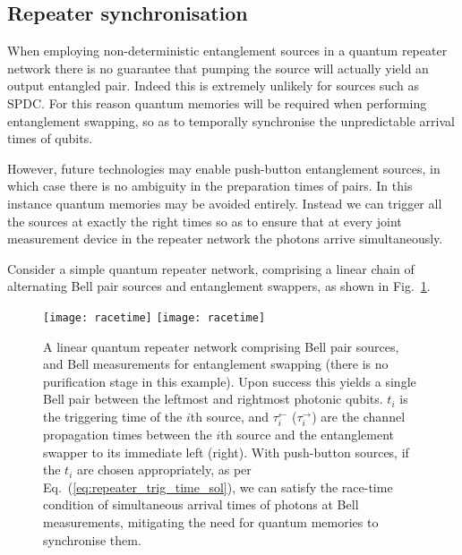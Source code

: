 %
%

\subsection{Repeater synchronisation}

When employing non-deterministic entanglement sources in a quantum repeater network there is no guarantee that pumping the source will actually yield an output entangled pair. Indeed this is extremely unlikely for sources such as SPDC. For this reason quantum memories will be required when performing entanglement swapping, so as to temporally synchronise the unpredictable arrival times of qubits.

However, future technologies may enable push-button entanglement sources, in which case there is no ambiguity in the preparation times of pairs. In this instance quantum memories may be avoided entirely. Instead we can trigger all the sources at exactly the right times so as to ensure that at every joint measurement device in the repeater network the photons arrive simultaneously.

Consider a simple quantum repeater network, comprising a linear chain of alternating Bell pair sources and entanglement swappers, as shown in Fig.~\ref{fig:racetime}.

\begin{figure}[!htbp]
\pubmode
	\texttt{[image: racetime]}
\else
	\texttt{[image: racetime]}
\fi
\captionspacefig \caption{A linear quantum repeater network comprising Bell pair sources, and Bell measurements for entanglement swapping (there is no purification stage in this example). Upon success this yields a single Bell pair between the leftmost and rightmost photonic qubits. $t_i$ is the triggering time of the $i$th source, and $\tau_i^\leftarrow$ ($\tau_i^\rightarrow$) are the channel propagation times between the $i$th source and the entanglement swapper to its immediate left (right). With push-button sources, if the $t_i$ are chosen appropriately, as per Eq.~(\ref{eq:repeater_trig_time_sol}), we can satisfy the race-time condition of simultaneous arrival times of photons at Bell measurements, mitigating the need for quantum memories to synchronise them.}\label{fig:racetime}	
\end{figure}

